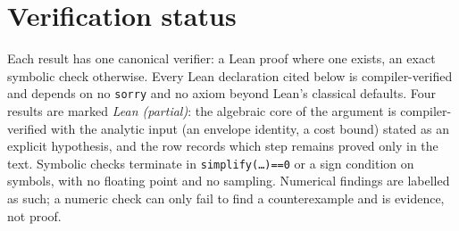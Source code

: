 \documentclass[11pt]{article}
\theoremstyle{remark}
\begin{document}
\appendix
\section{Verification status}
\label{app:status}

Each result has one canonical verifier: a Lean proof where one exists,
an exact symbolic check otherwise. Every Lean declaration cited below is
compiler-verified and depends on no \texttt{sorry} and no axiom beyond
Lean's classical defaults. Four results are marked \emph{Lean (partial)}:
the algebraic core of the argument is compiler-verified with the analytic
input (an envelope identity, a cost bound) stated as an explicit
hypothesis, and the row records which step remains proved only in the
text. Symbolic checks terminate in
\texttt{simplify(\dots)==0} or a sign condition on symbols, with no
floating point and no sampling. Numerical findings are labelled as such;
a numeric check can only fail to find a counterexample and is evidence,
not proof.
\end{document}
